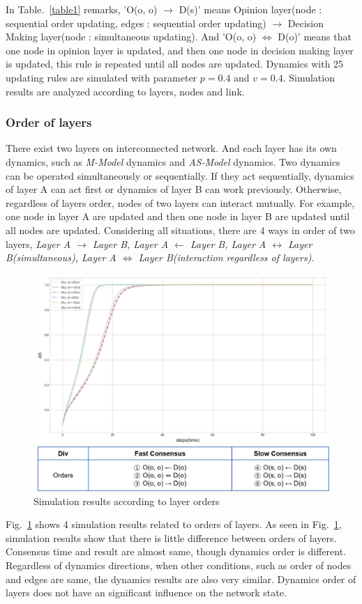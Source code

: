 \documentclass[review]{elsarticle}
\begin{document}
In Table.~\ref{table1} remarks, 'O(o, o) $\to$ D(s)’ means Opinion layer(node : sequential order updating, edges : sequential order updating) $\to$ Decision Making layer(node : simultaneous updating). And 'O(o, o) $\Leftrightarrow$ D(o)’ means that one node in opinion layer is updated, and then one node in decision making layer is updated, this rule is repeated until all nodes are updated. Dynamics with 25 updating rules are simulated with parameter $p=0.4$ and $v=0.4$. Simulation results are analyzed according to layers, nodes and link. 
 
\subsubsection{Order of layers}
There exist two layers on interconnected network. And each layer has its own dynamics, such as \textit{M-Model} dynamics and \textit{AS-Model} dynamics. Two dynamics can be operated simultaneously or sequentially. If they act sequentially, dynamics of layer A can act first or dynamics of layer B can work previously. Otherwise, regardless of layers order, nodes of two layers can interact mutually. For example, one node in layer A are updated and then one node in layer B are updated until all nodes are updated.  
Considering all situations, there are 4 ways in order of two layers, \textit{Layer A $\to$ Layer B, Layer A $\leftarrow$ Layer B, Layer A $\leftrightarrow$ Layer B(simultaneous), Layer A $\Leftrightarrow$ Layer B(interaction regardless of layers)}. 
\begin{figure}[!htb]
	\centering
	\includegraphics[width=\hsize]{layerorder.png}
	\caption{Simulation results according to layer orders}
	\label{layerorder}
\end{figure}
Fig.~\ref{layerorder} shows 4 simulation results related to orders of layers. As seen in Fig.~\ref{layerorder}, simulation results show that there is little difference between orders of layers. Consensus time and result are almost same, though dynamics order is different. Regardless of dynamics directions, when other conditions, such as order of nodes and edges are same, the dynamics results are also very similar. Dynamics order of layers does not have an significant influence on the network state.   
\end{document}
